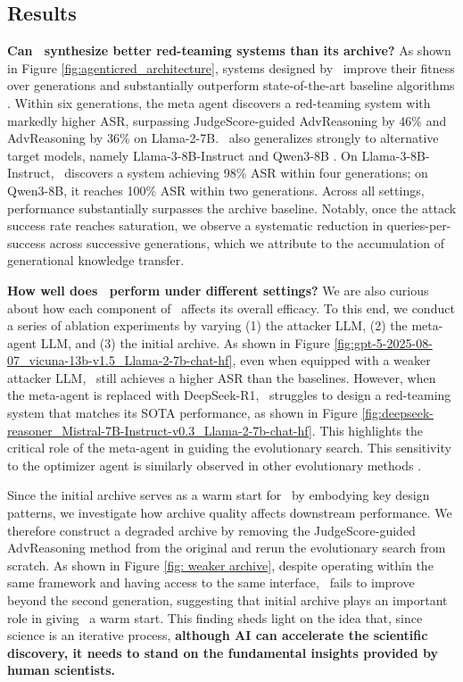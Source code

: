 \vspace{-0.2cm}
\subsection{Results}
\label{expr:results}
\textbf{Can \method~synthesize better red-teaming systems than its archive?} As shown in Figure \ref{fig:agenticred_architecture}, systems designed by \method~improve their fitness over generations and substantially outperform state-of-the-art baseline algorithms \citep{zhang2017adversarial, madaan2023selfrefineiterativerefinementselffeedback, liu2025autodanturbolifelongagentstrategy, chao2025jailbreaking, huang2026untargetedjailbreakattack}. Within six generations, the meta agent discovers a red-teaming system with markedly higher ASR, surpassing JudgeScore-guided AdvReasoning by 46\% and AdvReasoning by 36\% on Llama-2-7B. \method~also generalizes strongly to alternative target models, namely Llama-3-8B-Instruct \citep{llama3modelcard} and Qwen3-8B \citep{qwen3technicalreport}. On Llama-3-8B-Instruct, \method~discovers a system achieving 98\% ASR within four generations; on Qwen3-8B, it reaches 100\% ASR within two generations. Across all settings, performance substantially surpasses the archive baseline. Notably, once the attack success rate reaches saturation, we observe a systematic reduction in queries-per-success across successive generations, which we attribute to the accumulation of generational knowledge transfer.

\textbf{How well does \method~perform under different settings?} We are also curious about how each component of \method~affects its overall efficacy. To this end, we conduct a series of ablation experiments by varying (1) the attacker LLM, (2) the meta-agent LLM, and (3) the initial archive. As shown in Figure \ref{fig:gpt-5-2025-08-07_vicuna-13b-v1.5_Llama-2-7b-chat-hf}, even when equipped with a weaker attacker LLM, \method~still achieves a higher ASR than the baselines. However, when the meta-agent is replaced with DeepSeek-R1, \method~struggles to design a red-teaming system that matches its SOTA performance, as shown in Figure \ref{fig:deepseek-reasoner_Mistral-7B-Instruct-v0.3_Llama-2-7b-chat-hf}. This highlights the critical role of the meta-agent in guiding the evolutionary search. This sensitivity to the optimizer agent is similarly observed in other evolutionary methods \citep{si2026executiongroundedautomatedairesearch}.

Since the initial archive serves as a warm start for \method~by embodying key design patterns, we investigate how archive quality affects downstream performance. We therefore construct a degraded archive by removing the JudgeScore-guided AdvReasoning method from the original and rerun the evolutionary search from scratch. As shown in Figure \ref{fig: weaker archive}, despite operating within the same framework and having access to the same interface, \method~fails to improve beyond the second generation, suggesting that initial archive plays an important role in giving \method~a warm start. This finding sheds light on the idea that, since science is an iterative process, \textbf{although AI can accelerate the scientific discovery, it needs to stand on the fundamental insights provided by human scientists.}

